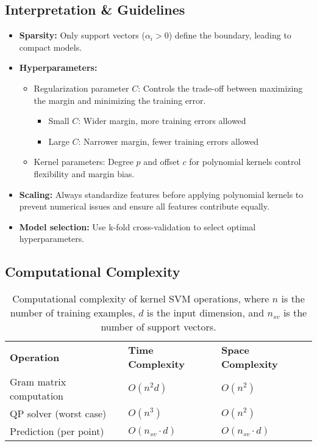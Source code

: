 \documentclass[11pt]{article}
\begin{document}
\subsection{Interpretation \& Guidelines}
\begin{itemize}
  \item \textbf{Sparsity:} Only support vectors ($\alpha_i>0$) define the boundary, leading to compact models.
  \item \textbf{Hyperparameters:} 
    \begin{itemize}
        \item Regularization parameter $C$: Controls the trade-off between maximizing the margin and minimizing the training error.
            \begin{itemize}
                \item Small $C$: Wider margin, more training errors allowed
                \item Large $C$: Narrower margin, fewer training errors allowed
            \end{itemize}
        \item Kernel parameters: Degree $p$ and offset $c$ for polynomial kernels control flexibility and margin bias.
    \end{itemize}
  \item \textbf{Scaling:} Always standardize features before applying polynomial kernels to prevent numerical issues and ensure all features contribute equally.
  \item \textbf{Model selection:} Use k-fold cross-validation to select optimal hyperparameters.
\end{itemize}

\subsection{Computational Complexity}
\begin{table}[h]
  \centering
  \begin{tabular}{lll}
    \textbf{Operation} & \textbf{Time Complexity} & \textbf{Space Complexity} \\
    Gram matrix computation & $O(n^2d)$ & $O(n^2)$ \\
    QP solver (worst case) & $O(n^3)$ & $O(n^2)$ \\
    Prediction (per point) & $O(n_{sv} \cdot d)$ & $O(n_{sv} \cdot d)$ \\
  \end{tabular}
  \caption{Computational complexity of kernel SVM operations, where $n$ is the number of training examples, $d$ is the input dimension, and $n_{sv}$ is the number of support vectors.}
\end{table}
\end{document}
